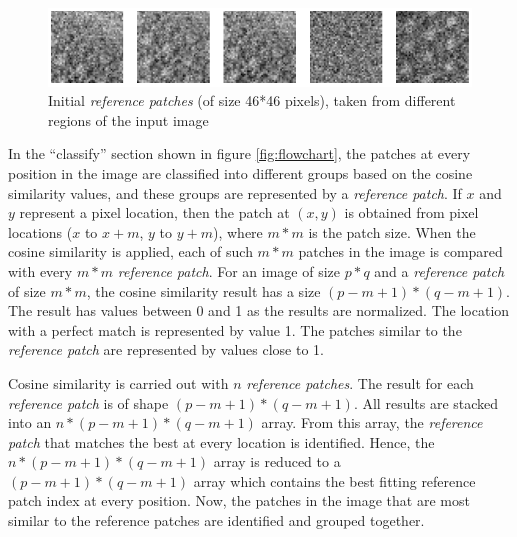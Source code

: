 \documentclass[fleqn,10pt]{wlscirep}
\begin{document}
\begin{figure}
	\centering
	\includegraphics[scale=0.75]{./imgs/initial_reference_patches.png}
	\caption[Initial \textit{reference patches}]{Initial \textit{reference patches} (of size 46*46 pixels), taken from different regions of the input image}
	\label{fig:initial_reference_patches}
\end{figure} 




In the ``classify” section shown in figure \ref{fig:flowchart}, the patches at every position in the image are classified into different groups based on the cosine similarity values, and these groups are represented by a \textit{reference patch}. If $x$ and $y$ represent a pixel location, then the patch at $(x, y)$ is obtained from pixel locations ($x$ to $x + m$, $y$ to $y + m$), where $m*m$ is the patch size. When the cosine similarity is applied, each of such $m*m$ patches in the image is compared with every $m*m$ \textit{reference patch}. For an image of size $p*q$ and a \textit{reference patch} of size $m*m$, the cosine similarity result has a size $(p - m + 1)*(q - m + 1)$. The result has values between 0 and 1 as the results are normalized. The location with a perfect match is represented by value 1. The patches similar to the \textit{reference patch} are represented by values close to 1. 

Cosine similarity is carried out with $n$ \textit{reference patches}. The result for each \textit{reference patch} is of shape $(p - m + 1)*(q - m + 1)$. All results are stacked into an $n * (p - m + 1)*(q - m + 1)$ array. From this array, the \textit{reference patch} that matches the best at every location is identified. Hence, the $n * (p - m + 1)*(q - m + 1)$ array is reduced to a  $(p - m + 1)*(q - m + 1)$ array which contains the best fitting reference patch index at every position. Now, the patches in the image that are most similar to the reference patches are identified  and grouped together.   

\end{document}
